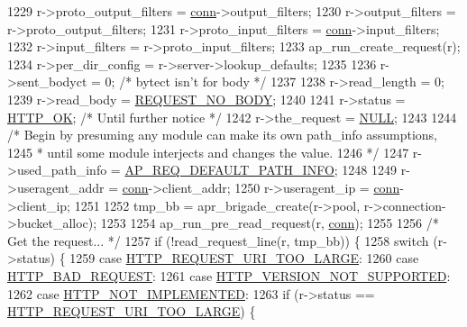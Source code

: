 \begin{DoxyCode}
1229     r->proto\_output\_filters = \hyperlink{group__MOD__PROXY_gaaf2a99e7e3709d3e41bf0a33f1004b4e}{conn}->output\_filters;
1230     r->output\_filters  = r->proto\_output\_filters;
1231     r->proto\_input\_filters = \hyperlink{group__MOD__PROXY_gaaf2a99e7e3709d3e41bf0a33f1004b4e}{conn}->input\_filters;
1232     r->input\_filters   = r->proto\_input\_filters;
1233     ap\_run\_create\_request(r);
1234     r->per\_dir\_config  = r->server->lookup\_defaults;
1235 
1236     r->sent\_bodyct     = 0;                      \textcolor{comment}{/* bytect isn't for body */}
1237 
1238     r->read\_length     = 0;
1239     r->read\_body       = \hyperlink{group__values__request__rec__body_gaf74625e7d4f8f352ed14a4bdf3f7262b}{REQUEST\_NO\_BODY};
1240 
1241     r->status          = \hyperlink{group__HTTP__Status_ga02e6d59009dee759528ec81fc9a8eeff}{HTTP\_OK};  \textcolor{comment}{/* Until further notice */}
1242     r->the\_request     = \hyperlink{pcre_8txt_ad7f989d16aa8ca809a36bc392c07fba1}{NULL};
1243 
1244     \textcolor{comment}{/* Begin by presuming any module can make its own path\_info assumptions,}
1245 \textcolor{comment}{     * until some module interjects and changes the value.}
1246 \textcolor{comment}{     */}
1247     r->used\_path\_info = \hyperlink{group__values__request__rec__used__path__info_ga0a636f7227021011d3fa0c2418b918fa}{AP\_REQ\_DEFAULT\_PATH\_INFO};
1248 
1249     r->useragent\_addr = \hyperlink{group__MOD__PROXY_gaaf2a99e7e3709d3e41bf0a33f1004b4e}{conn}->client\_addr;
1250     r->useragent\_ip = \hyperlink{group__MOD__PROXY_gaaf2a99e7e3709d3e41bf0a33f1004b4e}{conn}->client\_ip;
1251 
1252     tmp\_bb = apr\_brigade\_create(r->pool, r->connection->bucket\_alloc);
1253 
1254     ap\_run\_pre\_read\_request(r, \hyperlink{group__MOD__PROXY_gaaf2a99e7e3709d3e41bf0a33f1004b4e}{conn});
1255 
1256     \textcolor{comment}{/* Get the request... */}
1257     \textcolor{keywordflow}{if} (!read\_request\_line(r, tmp\_bb)) \{
1258         \textcolor{keywordflow}{switch} (r->status) \{
1259         \textcolor{keywordflow}{case} \hyperlink{group__HTTP__Status_ga4a24fc2734c1665d39672a81ee2a45a6}{HTTP\_REQUEST\_URI\_TOO\_LARGE}:
1260         \textcolor{keywordflow}{case} \hyperlink{group__HTTP__Status_ga0c1fdbbb10800664989907cbd3a5a023}{HTTP\_BAD\_REQUEST}:
1261         \textcolor{keywordflow}{case} \hyperlink{group__HTTP__Status_ga5afac709466d3e236035fcb89a432098}{HTTP\_VERSION\_NOT\_SUPPORTED}:
1262         \textcolor{keywordflow}{case} \hyperlink{group__HTTP__Status_gad8950a9ac05b1fe42c9a39dc7d8cbddf}{HTTP\_NOT\_IMPLEMENTED}:
1263             \textcolor{keywordflow}{if} (r->status == \hyperlink{group__HTTP__Status_ga4a24fc2734c1665d39672a81ee2a45a6}{HTTP\_REQUEST\_URI\_TOO\_LARGE}) \{

\end{DoxyCode}
